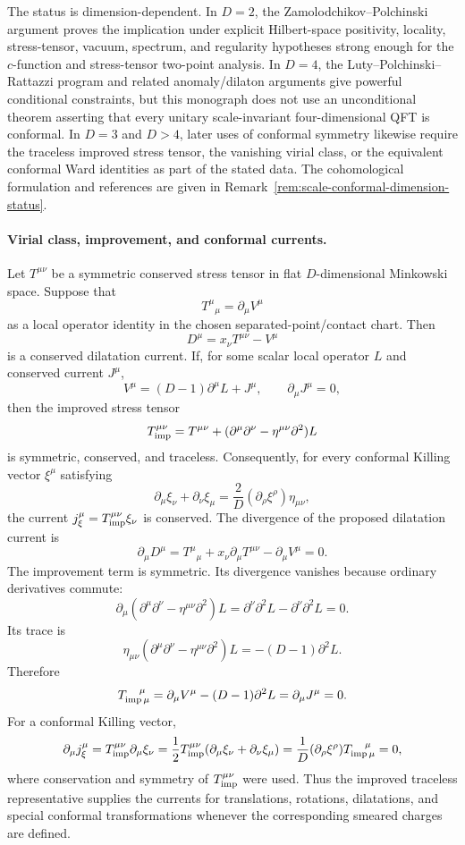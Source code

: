 \begin{remark}
The status is dimension-dependent.  In \(D=2\), the
Zamolodchikov--Polchinski argument proves the implication under explicit
Hilbert-space positivity, locality, stress-tensor, vacuum, spectrum, and
regularity hypotheses strong enough for the \(c\)-function and stress-tensor
two-point analysis.  In \(D=4\), the Luty--Polchinski--Rattazzi program and
related anomaly/dilaton arguments give powerful conditional constraints, but
this monograph does not use an unconditional theorem asserting that every
unitary scale-invariant four-dimensional QFT is conformal.  In \(D=3\) and
\(D>4\), later uses of conformal symmetry likewise require the traceless
improved stress tensor, the vanishing virial class, or the equivalent conformal
Ward identities as part of the stated data.  The cohomological formulation and
references are given in
Remark~\ref{rem:scale-conformal-dimension-status}.
\end{remark}

\paragraph{Virial class, improvement, and conformal currents.}
Let \(T^{\mu\nu}\) be a symmetric conserved stress tensor in flat
\(D\)-dimensional Minkowski space.  Suppose that
\[
  T^\mu{}_\mu=\partial_\mu V^\mu
\]
as a local operator identity in the chosen separated-point/contact chart.
Then
\[
  D^\mu=x_\nu T^{\mu\nu}-V^\mu
\]
is a conserved dilatation current.  If, for some scalar local operator \(L\)
and conserved current \(J^\mu\),
\[
  V^\mu=(D-1)\partial^\mu L+J^\mu,
  \qquad
  \partial_\mu J^\mu=0,
\]
then the improved stress tensor
\[
  T_{\rm imp}^{\mu\nu}
  =
  T^{\mu\nu}
  +
  (\partial^\mu\partial^\nu-\eta^{\mu\nu}\partial^2)L
\]
is symmetric, conserved, and traceless.  Consequently, for every conformal
Killing vector \(\xi^\mu\) satisfying
\[
  \partial_\mu\xi_\nu+\partial_\nu\xi_\mu
  =
  \frac2D(\partial_\rho\xi^\rho)\eta_{\mu\nu},
\]
the current \(j_\xi^\mu=T_{\rm imp}^{\mu\nu}\xi_\nu\) is conserved.
The divergence of the proposed dilatation current is
\[
  \partial_\mu D^\mu
  =
  T^\mu{}_\mu
  +x_\nu\partial_\mu T^{\mu\nu}
  -\partial_\mu V^\mu
  =
  0 .
\]
The improvement term is symmetric.  Its divergence vanishes because ordinary
derivatives commute:
\[
  \partial_\mu
  (\partial^\mu\partial^\nu-\eta^{\mu\nu}\partial^2)L
  =
  \partial^\nu\partial^2L-\partial^\nu\partial^2L
  =
  0 .
\]
Its trace is
\[
  \eta_{\mu\nu}
  (\partial^\mu\partial^\nu-\eta^{\mu\nu}\partial^2)L
  =
  -(D-1)\partial^2L .
\]
Therefore
\[
  T_{{\rm imp}\,\mu}^{\ \ \ \mu}
  =
  \partial_\mu V^\mu-(D-1)\partial^2L
  =
  \partial_\mu J^\mu
  =
  0 .
\]
For a conformal Killing vector,
\[
  \partial_\mu j_\xi^\mu
  =
  T_{\rm imp}^{\mu\nu}\partial_\mu\xi_\nu
  =
  \frac12T_{\rm imp}^{\mu\nu}
  (\partial_\mu\xi_\nu+\partial_\nu\xi_\mu)
  =
  \frac1D(\partial_\rho\xi^\rho)
  T_{{\rm imp}\,\mu}^{\ \ \ \mu}
  =
  0 ,
\]
where conservation and symmetry of \(T_{\rm imp}^{\mu\nu}\) were used.  Thus
the improved traceless representative supplies the currents for translations,
rotations, dilatations, and special conformal transformations whenever the
corresponding smeared charges are defined.

